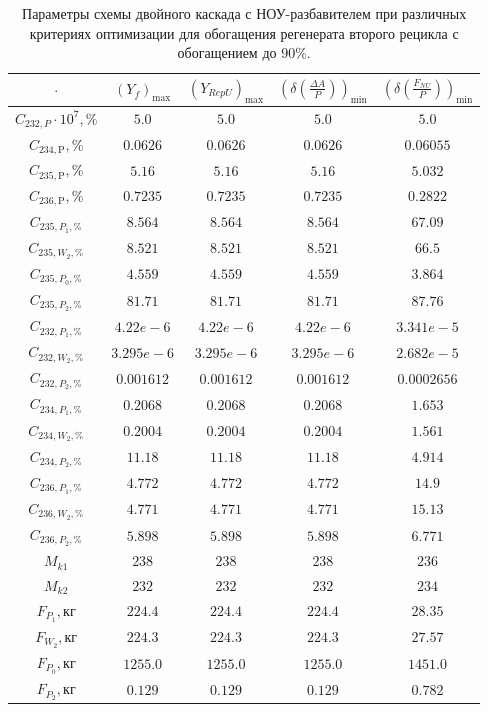 \begin{table}
    \centering
    \begin{tabular}{|c|cccc|}
        \hline $\cdot$ & $(Y_f)_\text{max}$ & $(Y_{RepU})_\text{max}$ & $(\delta(\frac{\Delta A}{P}))_\text{min}$ & $(\delta(\frac{F_{NU}}{P}))_\text{min}$\\ \hline
    $C_{232,P}\cdot10^{7}, \%$ & $5.0$ & $5.0$ & $5.0$ & $5.0$\\ \hline
    $C_{234,\text{P}}, \%$ & $0.0626$ & $0.0626$ & $0.0626$ & $0.06055$\\ \hline
    $C_{235,\text{P}}, \%$ & $5.16$ & $5.16$ & $5.16$ & $5.032$\\ \hline
    $C_{236,\text{P}}, \%$ & $0.7235$ & $0.7235$ & $0.7235$ & $0.2822$\\ \hline
    $C_{235,P_1, \%}$ & $8.564$ & $8.564$ & $8.564$ & $67.09$\\ \hline
    $C_{235,W_2, \%}$ & $8.521$ & $8.521$ & $8.521$ & $66.5$\\ \hline
    $C_{235,P_0, \%}$ & $4.559$ & $4.559$ & $4.559$ & $3.864$\\ \hline
    $C_{235,P_2, \%}$ & $81.71$ & $81.71$ & $81.71$ & $87.76$\\ \hline
    $C_{232,P_1, \%}$ & $4.22e-6$ & $4.22e-6$ & $4.22e-6$ & $3.341e-5$\\ \hline
    $C_{232,W_2, \%}$ & $3.295e-6$ & $3.295e-6$ & $3.295e-6$ & $2.682e-5$\\ \hline
    $C_{232,P_2, \%}$  & $0.001612$ & $0.001612$ & $0.001612$ & $0.0002656$\\ \hline
    $C_{234,P_1, \%}$ & $0.2068$ & $0.2068$ & $0.2068$ & $1.653$\\ \hline 
    $C_{234,W_2, \%}$ & $0.2004$ & $0.2004$ & $0.2004$ & $1.561$\\ \hline
    $C_{234,P_2, \%}$ & $11.18$ & $11.18$ & $11.18$ & $4.914$\\ \hline
    $C_{236,P_1, \%}$ & $4.772$ & $4.772$ & $4.772$ & $14.9$\\ \hline
    $C_{236,W_2, \%}$ & $4.771$ & $4.771$ & $4.771$ & $15.13$\\ \hline
    $C_{236,P_2, \%}$ & $5.898$ & $5.898$ & $5.898$ & $6.771$\\ \hline

    $M_{k1}$ & $238$ & $238$ & $238$ & $236$\\ \hline
    $M_{k2}$ & $232$ & $232$ & $232$ & $234$\\ \hline
    $F_{P_1}, \text{кг}$ & $224.4$ & $224.4$ & $224.4$ & $28.35$\\ \hline
    $F_{W_2}, \text{кг}$ & $224.3$ & $224.3$ & $224.3$ & $27.57$\\ \hline
    $F_{P_0}, \text{кг}$ & $1255.0$ & $1255.0$ & $1255.0$ & $1451.0$\\ \hline
    $F_{P_2}, \text{кг}$ & $0.129$ & $0.129$ & $0.129$ & $0.782$\\ \hline
\end{tabular}
\caption{Параметры схемы двойного каскада с НОУ-разбавителем при различных критериях оптимизации для обогащения регенерата второго рецикла с обогащением до 90\%.{\label{2opt2_90}}}
\end{table}


